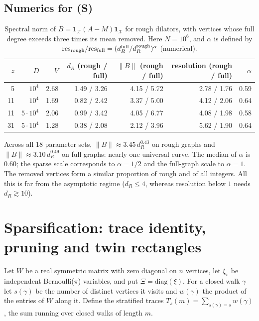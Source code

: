 \documentclass[11pt]{amsart}
\theoremstyle{definition}
\theoremstyle{remark}
\newcommand{\one}{\mathbf 1}
\begin{document}
\subsection{Numerics for (S)}
\begin{table}[h]
\centering\small
\begin{tabular}{rrrrrrr}
\toprule
$z$ & $D$ & $V$ & $d_R$ (rough / full) & $\|B\|$ (rough / full) & resolution (rough / full) & $\alpha$\\
\midrule
5 & $10^4$ & 2.68 & 1.49 / 3.26 & 4.15 / 5.72 & 2.78 / 1.76 & 0.59\\
11 & $10^4$ & 1.69 & 0.82 / 2.42 & 3.37 / 5.00 & 4.12 / 2.06 & 0.64\\
11 & $5\cdot10^4$ & 2.06 & 0.99 / 3.42 & 4.05 / 6.77 & 4.08 / 1.98 & 0.58\\
31 & $5\cdot10^4$ & 1.28 & 0.38 / 2.08 & 2.12 / 3.96 & 5.62 / 1.90 & 0.64\\
\bottomrule
\end{tabular}
\caption{Spectral norm of $B=\one_{\mathcal X}(A-M)\one_{\mathcal X}$ for rough dilators, with vertices whose full degree exceeds three times its mean removed. Here $N=10^6$, and $\alpha$ is defined by $\mathrm{res}_{\rm rough}/\mathrm{res}_{\rm full}=(d_R^{\rm full}/d_R^{\rm rough})^\alpha$ (numerical).}\label{tab:spec}
\end{table}

Across all $18$ parameter sets, $\|B\|\approx3.45\,d_R^{0.43}$ on rough graphs and $\|B\|\approx3.10\,d_R^{0.49}$ on full graphs: nearly one universal curve. The median of $\alpha$ is $0.60$; the sparse scale corresponds to $\alpha=1/2$ and the full-graph scale to $\alpha=1$. The removed vertices form a similar proportion of rough and of all integers. All this is far from the asymptotic regime ($d_R\le4$, whereas resolution below $1$ needs $d_R\gtrsim10$).

\section{Sparsification: trace identity, pruning and twin rectangles}\label{sec:sampling}

Let $W$ be a real symmetric matrix with zero diagonal on $n$ vertices, let $\xi_v$ be independent Bernoulli($\pi$) variables, and put $\Xi=\mathrm{diag}(\xi)$. For a closed walk $\gamma$ let $s(\gamma)$ be the number of distinct vertices it visits and $w(\gamma)$ the product of the entries of $W$ along it. Define the stratified traces $T_s(m)=\sum_{s(\gamma)=s}w(\gamma)$, the sum running over closed walks of length $m$.
\end{document}
